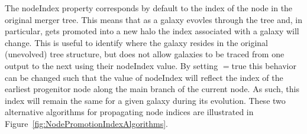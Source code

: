 The {\normalfont \ttfamily nodeIndex} property corresponds by default to the index of the node in the original merger tree. This means that as a galaxy evovles through the tree and, in particular, gets promoted into a new halo the index associated with a galaxy will change. This is useful to identify where the galaxy resides in the original (unevolved) tree structure, but does not allow galaxies to be traced from one output to the next using their {\normalfont \ttfamily nodeIndex} value. By setting {\normalfont \ttfamily [nodePromotionIndexShift]}$=${\normalfont \ttfamily true} this behavior can be changed such that the value of {\normalfont \ttfamily nodeIndex} will reflect the index of the earliest progenitor node along the main branch of the current node. As such, this index will remain the same for a given galaxy during its evolution. These two alternative algorithms for propagating node indices are illustrated in Figure~\ref{fig:NodePromotionIndexAlgorithms}.

